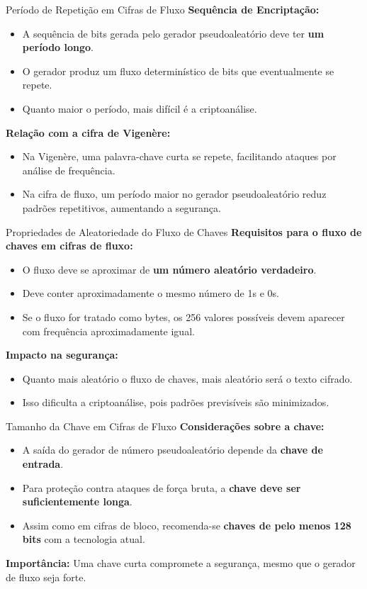 \begin{frame}{Período de Repetição em Cifras de Fluxo}
\textbf{Sequência de Encriptação:}
\begin{itemize}
    \item A sequência de bits gerada pelo gerador pseudoaleatório deve ter \textbf{um período longo}.
    \item O gerador produz um fluxo determinístico de bits que eventualmente se repete.
    \item Quanto maior o período, mais difícil é a criptoanálise.
\end{itemize}

\textbf{Relação com a cifra de Vigenère:}
\begin{itemize}
    \item Na Vigenère, uma palavra-chave curta se repete, facilitando ataques por análise de frequência.
    \item Na cifra de fluxo, um período maior no gerador pseudoaleatório reduz padrões repetitivos, aumentando a segurança.
\end{itemize}
\end{frame}

\begin{frame}{Propriedades de Aleatoriedade do Fluxo de Chaves}
\textbf{Requisitos para o fluxo de chaves em cifras de fluxo:}
\begin{itemize}
    \item O fluxo deve se aproximar de \textbf{um número aleatório verdadeiro}.
    \item Deve conter aproximadamente o mesmo número de 1s e 0s.
    \item Se o fluxo for tratado como bytes, os 256 valores possíveis devem aparecer com frequência aproximadamente igual.
\end{itemize}

\textbf{Impacto na segurança:}
\begin{itemize}
    \item Quanto mais aleatório o fluxo de chaves, mais aleatório será o texto cifrado.
    \item Isso dificulta a criptoanálise, pois padrões previsíveis são minimizados.
\end{itemize}
\end{frame}

\begin{frame}{Tamanho da Chave em Cifras de Fluxo}
\textbf{Considerações sobre a chave:}
\begin{itemize}
    \item A saída do gerador de número pseudoaleatório depende da \textbf{chave de entrada}.
    \item Para proteção contra ataques de força bruta, a \textbf{chave deve ser suficientemente longa}.
    \item Assim como em cifras de bloco, recomenda-se \textbf{chaves de pelo menos 128 bits} com a tecnologia atual.
\end{itemize}

\textbf{Importância:} Uma chave curta compromete a segurança, mesmo que o gerador de fluxo seja forte.
\end{frame}

